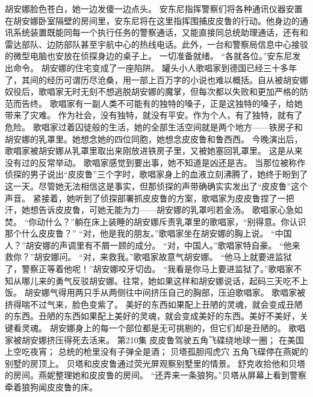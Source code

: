 \documentclass[a4paper,12pt,UTF8,twoside]{ctexbook}
\begin{document}
        胡安娜脸色苍白，她一边发傻一边点头。 
        安东尼指挥警察们将各种通讯仪器安置在胡安娜卧室隔壁的房间里，安东尼将在这里指挥围捕皮皮鲁的行动。他身边的通讯系统装置既能同每一个执行任务的警察通话，又能直接同总统助理通话，还有和雷达部队、边防部队甚至宇航中心的热线电话。此外，一台和警察局信息中心接驳的微型电脑也安放在侦探身边的桌子上。 
        一切准备就绪。 
        “各就各位。”安东尼发出命令。 
        胡安娜的住宅变成了一座陷阱。 
        罐头小人歌唱家到德国已经三十多年了，其间的经历可谓历尽沧桑，用一部上百万字的小说也难以概括。自从被胡安娜奴役后，歌唱家无时无刻不想逃脱胡安娜的魔掌，但每次都以失败和更加严格的防范而告终。 
        歌唱家有一副人类不可能有的独特的嗓子，正是这独特的嗓子，给她带来了灾难。 
        作为社会，没有独特，就没有平安。作为个人，有了独特，就有了危险。 
        歌唱家过着囚徒般的生活，她的全部生活空间就是两个地方——铁房子和胡安娜的乳罩里。她想念她的四位同胞，她想念皮皮鲁和鲁西西。 
        今晚演出后，歌唱家被胡安娜从乳罩里取出来刚放进铁房子里，又被她塞回乳罩里。 
        这是从来没有过的反常举动。 
        歌唱家感觉到要出事，她不知道是凶还是吉。 
        当那位被称作侦探的男子说出“皮皮鲁”三个字时，歌唱家身上的血液立刻沸腾了，她终于盼到了这一天。尽管她无法相信这是事实，但那侦探的声带确确实实发出了“皮皮鲁”这个声音。 
        紧接着，她听到了侦探部署抓皮皮鲁的方案，歌唱家为皮皮鲁捏了一把汗，她想告诉皮皮鲁，可她无能为力——胡安娜的乳罩吲若金汤。 
        歌唱家心急如焚。 
      “你动什么？”躺在床上装睡的胡安娜斥责乳罩里的歌唱家，“别得意。你认识那个什么皮皮鲁？” 
        “对，他是我的朋友。”歌唱家坐在胡安娜的胸上说。 
        “中国人？”胡安娜的声调里有不屑一顾的成分。 
        “对，中国人。”歌唱家特自豪。 
        “他来救你？”胡安娜问。 
        “对，来救我。”歌唱家故意气胡安娜。 
        “他马上就要进监狱了，警察正等着他呢！”胡安娜咬牙切齿。 
        “我看是你马上要进监狱了。”歌唱家不知从哪儿来的勇气反驳胡安娜。往常，她如果这样和胡安娜说话，起码三天吃不上饭。 
        胡安娜气得用两只手从两侧往中间挤压自己的胸部，压迫歌唱家。 
        歌唱家被挤得喘不过气来，脸色变紫了。 
        美好的东西如果配上丑陋的灵魂，就会变成丑陋的东西。丑陋的东西如果配上美好的灵魂，就会变成美好的东西。美好不美好，关键看灵魂。 
        胡安娜身上的每一个部位都是无可挑剔的，但它们却是丑陋的。 
        歌唱家被胡安娜挤压得死去活来。   第210集 
        皮皮鲁驾驶五角飞碟绕地球一圈； 
        在美国上空吃夜宵； 
        总统的枪里没有子弹全是酒； 
        贝塔孤胆闯虎穴   
        五角飞碟停在燕妮的别墅的房顶上。 
        贝塔和皮皮鲁通过荧光屏观察别墅里的情景。 
        舒克收拾他和贝塔的房间。燕妮整理她和皮皮鲁的房间。 
        “还弄来一条狼狗。”贝塔从屏幕上看到警察牵着狼狗闻皮皮鲁的床。 
\end{document}
